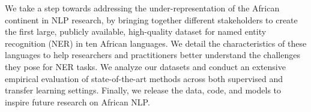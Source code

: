 We take a step towards addressing the under-representation of the African continent in NLP research, by bringing together different stakeholders to create the first large, publicly available, high-quality dataset for named entity recognition (NER) in ten African languages. We detail the characteristics of these languages to help researchers and practitioners better understand the challenges they pose for NER tasks. We analyze our datasets and conduct an extensive empirical evaluation of state-of-the-art methods across both supervised and transfer learning settings. Finally, we release the data, code, and models to inspire future research on African NLP.
